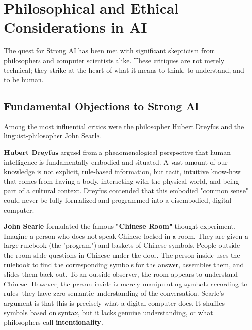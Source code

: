 \section{Philosophical and Ethical Considerations in AI}
\label{sec:philosophy_ethics}
The quest for Strong AI has been met with significant skepticism from philosophers and computer scientists alike. These critiques are not merely technical; they strike at the heart of what it means to think, to understand, and to be human.

\subsection*{Fundamental Objections to Strong AI}
Among the most influential critics were the philosopher Hubert Dreyfus and the linguist-philosopher John Searle.

\textbf{Hubert Dreyfus} argued from a phenomenological perspective that human intelligence is fundamentally embodied and situated. A vast amount of our knowledge is not explicit, rule-based information, but tacit, intuitive know-how that comes from having a body, interacting with the physical world, and being part of a cultural context. Dreyfus contended that this embodied "common sense" could never be fully formalized and programmed into a disembodied, digital computer.

\textbf{John Searle} formulated the famous \textbf{"Chinese Room"} thought experiment. Imagine a person who does not speak Chinese locked in a room. They are given a large rulebook (the "program") and baskets of Chinese symbols. People outside the room slide questions in Chinese under the door. The person inside uses the rulebook to find the corresponding symbols for the answer, assembles them, and slides them back out. To an outside observer, the room appears to understand Chinese. However, the person inside is merely manipulating symbols according to rules; they have zero semantic understanding of the conversation. Searle's argument is that this is precisely what a digital computer does. It shuffles symbols based on syntax, but it lacks genuine understanding, or what philosophers call \textbf{intentionality}.

